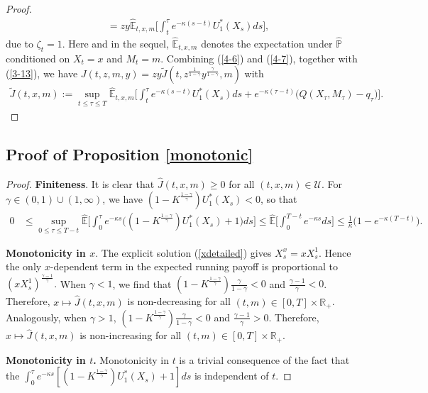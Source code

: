 \documentclass[a4paper,11pt]{amsart}
\numberwithin{equation}{section}
\newcommand{\blue}[1]{{\color{black}#1}}
\begin{document}
{\begin{proof}
\begin{align}
&=zy\widehat{\mathbb{E}}_{t,x,m}\bigg[    \int_t^{\tau }  e^{-\kappa(s-t)} {U}^\ast_1(X_s) ds\bigg],
\end{align}
due to $\zeta_t=1$. Here and in the sequel, $\widehat{\mathbb{E}}_{t,x,m}$ denotes the expectation under $\widehat{\mathbb{P}}$ conditioned on $X_t=x$ and $M_t=m$. Combining (\ref{4-6}) and (\ref{4-7}), together with (\ref{3-13}), we have $J(t,z,m,y)= zy \widetilde{J}(t,z^{\frac{1}{1-\gamma}}y^{\frac{\gamma}{1-\gamma}},m)$ with
\begin{align*}
\widetilde{J}(t,x,m):=\sup_{t \leq \tau \leq T
} \widehat{\mathbb{E}}_{t,x,m}\bigg[    \int_t^{\tau }  e^{-\kappa(s-t)} {U}^\ast_1(X_s) ds+ e^{-\kappa(\tau-t)}  \Big(Q(X_\tau, M_\tau)- q_\tau \Big)\bigg].
\end{align*}\end{proof}

\subsection{Proof of Proposition \ref{monotonic}}
\begin{proof}\label{promonotonic}
\textbf{Finiteness}. It is clear that $ \widehat{J}(t,x,m)\geq 0$ for all $(t,x,m) \in \mathcal{U}$. For $\gamma \in (0,1) \cup (1,\infty)$, we have $(1-K^{\frac{1-\gamma}{\gamma}})U_1^\ast(X_s)<0$, so that \begin{align*}
0&\leq \sup_{0 \leq \tau \leq T-t} \widehat{\mathbb{E}}\bigg[    \int_0^{\tau }  e^{-\kappa s}\Big( (1-K^{\frac{1-\gamma}{\gamma}}){U}^\ast_1(X_s) +1 \Big)ds \bigg]
\leq   \widehat{\mathbb{E}}\bigg[    \int_0^{T-t}  e^{-\kappa s}ds \bigg] \leq \frac{1}{\kappa}\Big(1-e^{-\kappa(T-t)}\Big).
\end{align*}

\textbf{Monotonicity in $x$}. \blue{The explicit solution (\ref{xdetailed}) gives $X_s^x=xX_s^1$. Hence the only $x$-dependent term in the expected running payoff is proportional to $(xX_s^1)^{\frac{\gamma-1}{\gamma}}$.} When $\gamma<1$, we find that $(1-K^{\frac{1-\gamma}{\gamma}}) \frac{\gamma}{1-\gamma}<0$ and $\frac{\gamma-1}{\gamma}<0$. Therefore, $x \mapsto \widehat{J}(t,x,m) $ is non-decreasing for all $(t,m)  \in [0,T] \times \mathbb{R}_+$. Analogously, when $\gamma>1$, $(1-K^{\frac{1-\gamma}{\gamma}}) \frac{\gamma}{1-\gamma}<0$ and $\frac{\gamma-1}{\gamma}>0$. Therefore,  $x \mapsto \widehat{J}(t,x,m) $ is non-increasing for all $(t,m)  \in [0,T] \times \mathbb{R}_+$.

\textbf{Monotonicity in $t$.} Monotonicity in $t$ is a trivial consequence of the fact that the $  \int_0^{\tau }  e^{-\kappa s}[ (1-K^{\frac{1-\gamma}{\gamma}}){U}^\ast_1(X_s) +1 ]ds$  is independent of $t$.


\end{proof}}
\end{document}
